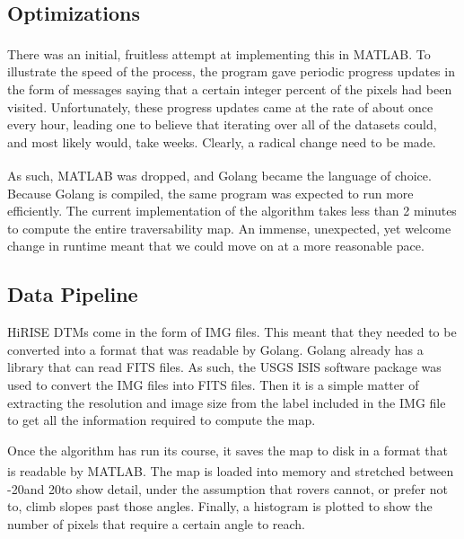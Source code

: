 \documentclass[12pt]{article}
\newcommand{\MATLAB}{MATLAB\textsuperscript{\textregistered}}
\begin{document}
\subsection{Optimizations}
\label{sub:optimizations}
\par There was an initial, fruitless attempt at implementing this in \MATLAB{}. To illustrate the speed of the process, the program gave periodic progress updates in the form of messages saying that a certain integer percent of the pixels had been visited. Unfortunately, these progress updates came at the rate of about once every hour, leading one to believe that iterating over all of the datasets could, and most likely would, take weeks. Clearly, a radical change need to be made.
\par As such, \MATLAB{} was dropped, and Golang became the language of choice. Because Golang is compiled, the same program was expected to run more efficiently. The current implementation of the algorithm takes less than 2 minutes to compute the entire traversability map. An immense, unexpected, yet welcome change in runtime meant that we could move on at a more reasonable pace.

\subsection{Data Pipeline}
\label{sub:data_pipeline}
\par HiRISE DTMs come in the form of IMG files. This meant that they needed to be converted into a format that was readable by Golang. Golang already has a library that can read FITS files. As such, the USGS ISIS software package was used to convert the IMG files into FITS files. Then it is a simple matter of extracting the resolution and image size from the label included in the IMG file to get all the information required to compute the map.
\par Once the algorithm has run its course, it saves the map to disk in a format that is readable by \MATLAB{}. The map is loaded into memory and stretched between -20\textdegree and 20\textdegree to show detail, under the assumption that rovers cannot, or prefer not to, climb slopes past those angles. Finally, a histogram is plotted to show the number of pixels that require a certain angle to reach.
\end{document}
